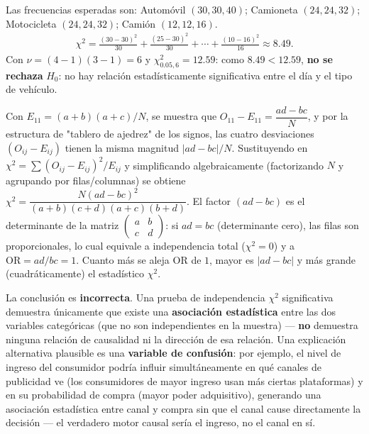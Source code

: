 \begin{solproblema}[prob:147e151]
	Las frecuencias esperadas son: Automóvil $(30,30,40)$; Camioneta $(24,24,32)$; Motocicleta $(24,24,32)$; Camión $(12,12,16)$.
	\begin{align*}
		\chi^2 = \frac{(30-30)^2}{30}+\frac{(25-30)^2}{30}+\cdots+\frac{(10-16)^2}{16} \approx 8.49.
	\end{align*}
	Con $\nu=(4-1)(3-1)=6$ y $\chi^2_{0.05,6}=12.59$: como $8.49<12.59$, \textbf{no se rechaza} $H_0$: no hay relación estadísticamente significativa entre el día y el tipo de vehículo.
\end{solproblema}

\begin{solproblema}[prob:3c6b064]
	Con $E_{11}=(a+b)(a+c)/N$, se muestra que $O_{11}-E_{11} = \dfrac{ad-bc}{N}$, y por la estructura de "tablero de ajedrez" de los signos, las cuatro desviaciones $(O_{ij}-E_{ij})$ tienen la misma magnitud $|ad-bc|/N$. Sustituyendo en $\chi^2=\sum(O_{ij}-E_{ij})^2/E_{ij}$ y simplificando algebraicamente (factorizando $N$ y agrupando por filas/columnas) se obtiene $\chi^2 = \dfrac{N(ad-bc)^2}{(a+b)(c+d)(a+c)(b+d)}$. El factor $(ad-bc)$ es el determinante de la matriz $\begin{pmatrix}a&b\\c&d\end{pmatrix}$: si $ad=bc$ (determinante cero), las filas son proporcionales, lo cual equivale a independencia total ($\chi^2=0$) y a $\text{OR}=ad/bc=1$. Cuanto más se aleja $\text{OR}$ de $1$, mayor es $|ad-bc|$ y más grande (cuadráticamente) el estadístico $\chi^2$.
\end{solproblema}

\begin{solproblema}[prob:878a46f]
	La conclusión es \textbf{incorrecta}. Una prueba de independencia $\chi^2$ significativa demuestra únicamente que existe una \textbf{asociación estadística} entre las dos variables categóricas (que no son independientes en la muestra) — \textbf{no} demuestra ninguna relación de causalidad ni la dirección de esa relación. Una explicación alternativa plausible es una \textbf{variable de confusión}: por ejemplo, el nivel de ingreso del consumidor podría influir simultáneamente en qué canales de publicidad ve (los consumidores de mayor ingreso usan más ciertas plataformas) y en su probabilidad de compra (mayor poder adquisitivo), generando una asociación estadística entre canal y compra sin que el canal cause directamente la decisión — el verdadero motor causal sería el ingreso, no el canal en sí.
\end{solproblema}


